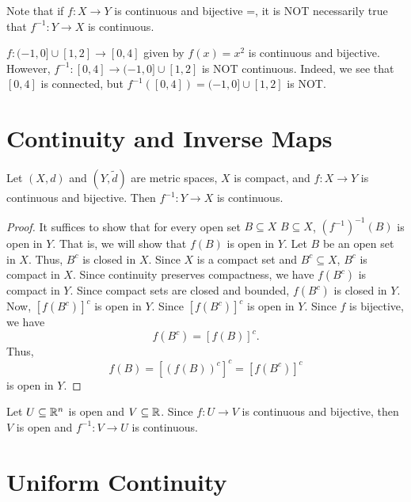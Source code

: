 \documentclass[a4paper]{article}
\begin{document}
Note that if \( f : X \to  Y \) is continuous and bijective =, it is NOT necessarily true that \( f^{-1}: Y \to X  \) is continuous.

\begin{eg}
    \( f: (-1,0] \cup [1,2] \to [0,4] \) given by \( f(x) = x^{2} \) is continuous and bijective. However, \( f^{-1}: [0,4] \to (-1,0] \cup [1,2] \) is NOT continuous. Indeed, we see that \( [0,4] \) is connected, but \( f^{-1}([0,4]) = (-1,0] \cup [1,2] \) is NOT.  
\end{eg}  


\section{Continuity and Inverse Maps}\label{Continuity and Inverse Maps}

\begin{theorem}
    Let \( (X,d) \) and \( (Y,\tilde{d}) \) are metric spaces, \( X  \) is compact, and \( f: X \to Y  \) is continuous and bijective. Then \( f^{-1}: Y \to X  \) is continuous.
\end{theorem}
\begin{proof}
    It suffices to show that for every open set \( B \subseteq  X  \) \( B \subseteq  X  \), \( (f^{-1})^{-1}(B) \) is open in \( Y \). That is, we will show that \( f(B) \) is open in \( Y \). Let \( B  \) be an open set in \( X  \). Thus, \( B^{c} \) is closed in \( X  \). Since \( X  \) is a compact set and \( B^{c} \subseteq  X  \), \( B^{c} \) is compact in \( X  \). Since continuity preserves compactness, we have \( f(B^{c}) \) is compact in \( Y \). Since compact sets are closed and bounded, \( f(B^{c}) \) is closed in \( Y \). Now, \( [f(B^{c})]^{c} \) is open in \( Y \). Since \( [f(B^{c})]^{c} \) is open in \( Y \). Since \( f  \) is bijective, we have 
    \[  f(B^{c}) = [f(B)]^{c}. \] 
    Thus,
    \[ f(B) = [(f(B))^{c}]^{c} = [f(B^{c})]^{c} \]
    is open in \( Y \).
\end{proof}

\begin{remark}
   Let \( U \subseteq \mathbb{R}^{n} \) is open and \(V \subseteq \mathbb{R}  \). Since \( f: U \to V  \) is continuous and bijective, then \( V  \) is open and \( f^{-1}: V \to U \) is continuous. 
\end{remark}

\section{Uniform Continuity}\label{Uniform Continuity}
\end{document}
